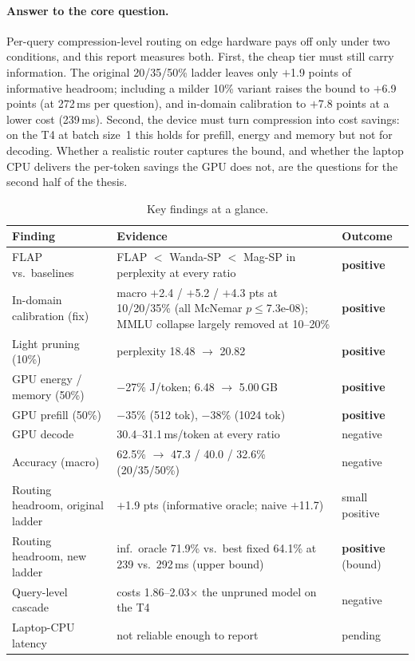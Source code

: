 \paragraph{Answer to the core question.} Per-query compression-level routing on edge hardware pays off only under two conditions, and this report measures both. First, the cheap tier must still carry information. The original 20/35/50\% ladder leaves only $+$1.9 points of informative headroom; including a milder 10\% variant raises the bound to $+$6.9 points (at 272\,ms per question), and in-domain calibration to $+$7.8 points at a lower cost (239\,ms). Second, the device must turn compression into cost savings: on the T4 at batch size~1 this holds for prefill, energy and memory but not for decoding. Whether a realistic router captures the bound, and whether the laptop CPU delivers the per-token savings the GPU does not, are the questions for the second half of the thesis.

\begin{table}[!htbp]\centering\small
\begin{tabularx}{\linewidth}{lXl}
\toprule
Finding & Evidence & Outcome \\
\midrule
FLAP vs.\ baselines & FLAP $<$ Wanda-SP $<$ Mag-SP in perplexity at every ratio & \textbf{positive} \\
In-domain calibration (fix) & macro $+$2.4 / $+$5.2 / $+$4.3 pts at 10/20/35\% (all McNemar $p\le$7.3e-08); MMLU collapse largely removed at 10--20\% & \textbf{positive} \\
Light pruning (10\%) & perplexity 18.48 $\to$ 20.82 & \textbf{positive} \\
GPU energy / memory (50\%) & $-$27\% J/token; 6.48 $\to$ 5.00\,GB & \textbf{positive} \\
GPU prefill (50\%) & $-$35\% (512 tok), $-$38\% (1024 tok) & \textbf{positive} \\
GPU decode & 30.4--31.1\,ms/token at every ratio & negative \\
Accuracy (macro) & 62.5\% $\to$ 47.3 / 40.0 / 32.6\% (20/35/50\%) & negative \\
Routing headroom, original ladder & $+$1.9 pts (informative oracle; naive $+$11.7) & small positive \\
Routing headroom, new ladder & inf.\ oracle 71.9\% vs.\ best fixed 64.1\% at 239 vs.\ 292\,ms (upper bound) & \textbf{positive} (bound) \\
Query-level cascade & costs 1.86--2.03$\times$ the unpruned model on the T4 & negative \\
Laptop-CPU latency & not reliable enough to report & pending \\
\bottomrule
\end{tabularx}
\caption{Key findings at a glance.}\label{tab:glance}
\end{table}

